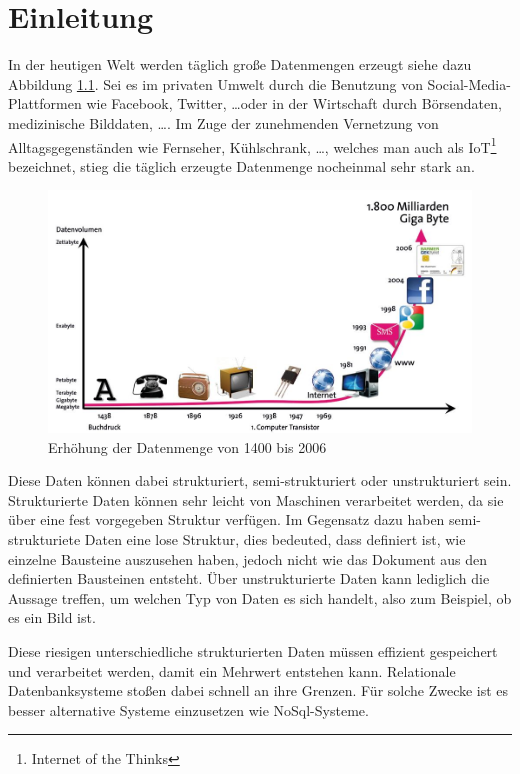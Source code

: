 \chapter{Einleitung}

In der heutigen Welt werden täglich große Datenmengen erzeugt siehe dazu
Abbildung \ref{fig:data-grow}. Sei es im privaten Umwelt durch die Benutzung
von Social-Media-Plattformen wie Facebook, Twitter, \ldots oder in der
Wirtschaft durch Börsendaten, medizinische Bilddaten, \ldots . Im Zuge der
zunehmenden Vernetzung von Alltagsgegenständen wie Fernseher,
Kühlschrank, \ldots, welches man auch als IoT\footnote{Internet of the Thinks}
bezeichnet, stieg die täglich erzeugte Datenmenge nocheinmal sehr stark an.

\begin{figure}
\centering
\includegraphics[scale=0.25]{images/bitkom-lf-bigdata-2012-data_grow.jpg}
\caption{Erhöhung der Datenmenge von 1400 bis 2006 \cite{Weber2012}}
\label{fig:data-grow}
\end{figure}

Diese Daten können dabei strukturiert, semi-strukturiert oder unstrukturiert
sein. Strukturierte Daten können sehr leicht von Maschinen verarbeitet werden,
da sie über eine fest vorgegeben Struktur verfügen. Im Gegensatz dazu haben
semi-strukturiete Daten eine lose Struktur, dies bedeuted, dass definiert ist,
wie einzelne Bausteine auszusehen haben, jedoch nicht wie das Dokument aus den
definierten Bausteinen entsteht. Über unstrukturierte Daten kann lediglich die
Aussage treffen, um welchen Typ von Daten es sich handelt, also zum Beispiel,
ob es ein Bild ist.

Diese riesigen unterschiedliche strukturierten Daten müssen effizient
gespeichert und verarbeitet werden, damit ein Mehrwert entstehen kann.
Relationale Datenbanksysteme stoßen dabei schnell an ihre Grenzen. Für solche
Zwecke ist es besser alternative Systeme einzusetzen wie NoSql-Systeme.

